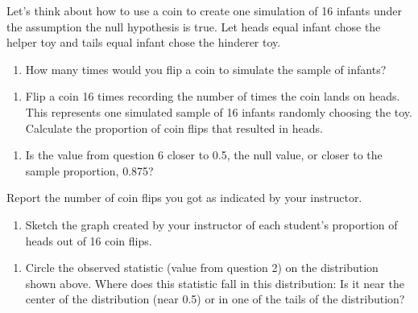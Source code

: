 \documentclass[
]{report}
\providecommand{\tightlist}{%
  \setlength{\itemsep}{0pt}\setlength{\parskip}{0pt}}
\begin{document}
Let's think about how to use a coin to create one simulation of 16 infants under the assumption the null hypothesis is true. Let heads equal infant chose the helper toy and tails equal infant chose the hinderer toy.

\begin{enumerate}
\def\labelenumi{\arabic{enumi}.}
\setcounter{enumi}{4}
\tightlist
\item
  How many times would you flip a coin to simulate the sample of infants?
\end{enumerate}

\vspace{0.2in}

\begin{enumerate}
\def\labelenumi{\arabic{enumi}.}
\setcounter{enumi}{5}
\tightlist
\item
  Flip a coin 16 times recording the number of times the coin lands on heads. This represents one simulated sample of 16 infants randomly choosing the toy. Calculate the proportion of coin flips that resulted in heads.
\end{enumerate}

\vspace{0.2in}

\begin{enumerate}
\def\labelenumi{\arabic{enumi}.}
\setcounter{enumi}{6}
\tightlist
\item
  Is the value from question 6 closer to 0.5, the null value, or closer to the sample proportion, 0.875?
\end{enumerate}

\vspace{0.2in}

Report the number of coin flips you got as indicated by your instructor.

\begin{enumerate}
\def\labelenumi{\arabic{enumi}.}
\setcounter{enumi}{7}
\tightlist
\item
  Sketch the graph created by your instructor of each student's proportion of heads out of 16 coin flips.
\end{enumerate}

\vspace{2in}

\begin{enumerate}
\def\labelenumi{\arabic{enumi}.}
\setcounter{enumi}{8}
\tightlist
\item
  Circle the observed statistic (value from question 2) on the distribution shown above. Where does this statistic fall in this distribution: Is it near the center of the distribution (near 0.5) or in one of the tails of the distribution?
\end{enumerate}
\end{document}
